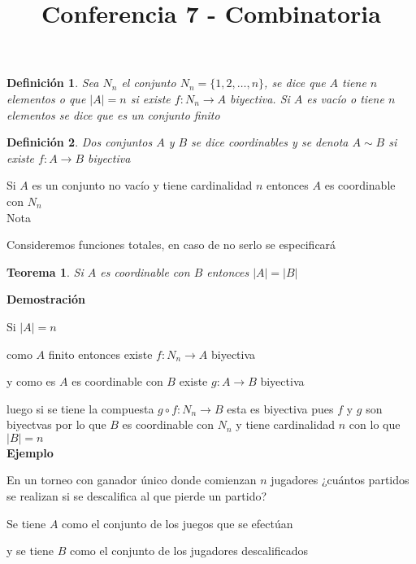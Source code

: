 \documentclass[a4paper,12pt]{report}
\title{Conferencia 7 - Combinatoria}
\author{}
\newtheorem*{teo}{Teorema}
\newtheorem*{dfn}{Definición}
\begin{document}
\maketitle



\begin{dfn}
  Sea $N_n$ el conjunto $N_n=\{1,2,\dots,n\}$, se dice que $A$ tiene $n$ elementos o que $|A|=n$ si existe $f:N_n\rightarrow A$ biyectiva. Si $A$ es vacío o tiene $n$ elementos se dice que es un conjunto finito
\end{dfn}

\begin{dfn}
 Dos conjuntos $A$ y $B$ se dice coordinables y se denota $A \sim B$ si existe $f:A\rightarrow B$ biyectiva
\end{dfn}


Si $A$ es  un conjunto no vacío y tiene cardinalidad $n$ entonces  $A$ es coordinable con $N_n$\\

Nota

Consideremos funciones totales, en caso de no serlo se especificar\'a\\


\begin{teo}
 Si $A$ es coordinable con $B$ entonces $|A|=|B|$
\end{teo}


\textbf{Demostración}

Si $|A|=n$ 

como $A$ finito entonces existe $f:N_n\rightarrow A$ biyectiva

y como es $A$ es coordinable con $B$ existe $g:A\rightarrow B$ biyectiva

luego si se tiene la compuesta $g\circ f: N_n\rightarrow B$ esta es biyectiva pues $f$ y $g$  son biyectvas por lo que $B$ es coordinable con $N_n$ y tiene cardinalidad $n$ con lo que $|B|=n$\\

\textbf{Ejemplo}
 
 En un torneo con ganador único donde comienzan $n$ jugadores ¿cuántos partidos se realizan si se descalifica al que pierde un partido?
 
 Se tiene $A$ como el conjunto de los juegos que se efectúan
 
 y se tiene $B$ como el conjunto de los jugadores descalificados
 
\end{document}

